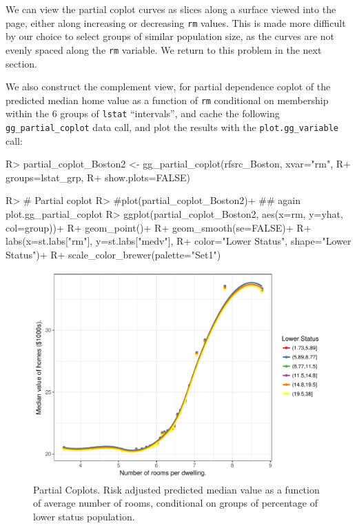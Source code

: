 \documentclass[article]{jss}
\begin{document}
We can view the partial coplot curves as slices along a surface viewed
into the page, either along increasing or decreasing \texttt{rm} values.
This is made more difficult by our choice to select groups of similar
population size, as the curves are not evenly spaced along the
\texttt{rm} variable. We return to this problem in the next section.

We also construct the complement view, for partial dependence coplot of
the predicted median home value as a function of \texttt{rm} conditional
on membership within the 6 groups of \texttt{lstat} ``intervals'', and
cache the following \texttt{gg\_partial\_coplot} data call, and plot the
results with the \texttt{plot.gg\_variable} call:

\begin{CodeChunk}

\begin{CodeInput}
R> partial_coplot_Boston2 <- gg_partial_coplot(rfsrc_Boston, xvar="rm", 
R+                                             groups=lstat_grp,
R+                                             show.plots=FALSE)
\end{CodeInput}
\end{CodeChunk}

\begin{CodeChunk}

\begin{CodeInput}
R> # Partial coplot
R> #plot(partial_coplot_Boston2)+ ## again plot.gg_partial_coplot
R> ggplot(partial_coplot_Boston2, aes(x=rm, y=yhat, col=group))+
R+   geom_point()+
R+   geom_smooth(se=FALSE)+
R+   labs(x=st.labs["rm"], y=st.labs["medv"], 
R+        color="Lower Status", shape="Lower Status")+
R+   scale_color_brewer(palette="Set1")
\end{CodeInput}
\begin{figure}

{\centering \includegraphics{Regression-rfsrc_files/figure-latex/prtl-coplots2-1} 

}

\caption[Partial Coplots]{Partial Coplots. Risk adjusted predicted median value as a function of average number of rooms, conditional on groups of percentage of lower status population.}\label{fig:prtl-coplots2}
\end{figure}
\end{CodeChunk}
\end{document}

